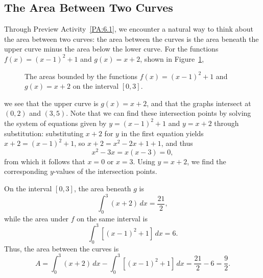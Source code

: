

\subsection*{The Area Between Two Curves} 

Through Preview Activity~\ref{PA:6.1}, we encounter a natural way to think about the area between two curves:  the area between the curves is the area beneath the upper curve minus the area below the lower curve.    For the functions $f(x) = (x-1)^2 + 1$ and $g(x) = x+2$, shown in Figure~\ref{F:6.1.PA1revisited}, 
\begin{figure}[h]
\begin{center}
\caption{The areas bounded by the functions $f(x) = (x-1)^2 + 1$ and $g(x) = x+2$ on the interval $[0,3]$.} \label{F:6.1.PA1revisited}
\end{center}
\end{figure}
we see that the upper curve is $g(x) = x+2$, and that the graphs intersect at $(0,2)$ and $(3,5)$.  Note that we can find these intersection points by solving the system of equations given by $y = (x-1)^2 + 1$ and $y = x+2$ through substitution:  substituting $x+2$ for $y$ in the first equation yields $x+2 = (x-1)^2 + 1$, so $x+2 = x^2 - 2x + 1 + 1$, and thus
$$x^2 - 3x = x(x-3) = 0,$$
from which it follows that $x = 0$ or $x = 3$.  Using $y = x+2$, we find the corresponding $y$-values of the intersection points.

On the interval $[0,3]$, the area beneath $g$ is
$$\int_0^3 (x+2) \, dx = \frac{21}{2},$$
while the area under $f$ on the same interval is
$$\int_0^3 [(x-1)^2 + 1] \, dx = 6.$$
Thus, the area between the curves is 
\begin{equation} \label{E:DiffOfInt}
A = \int_0^3 (x+2) \, dx -  \int_0^3 [(x-1)^2 + 1] \, dx = \frac{21}{2} - 6 = \frac{9}{2}.
\end{equation}


